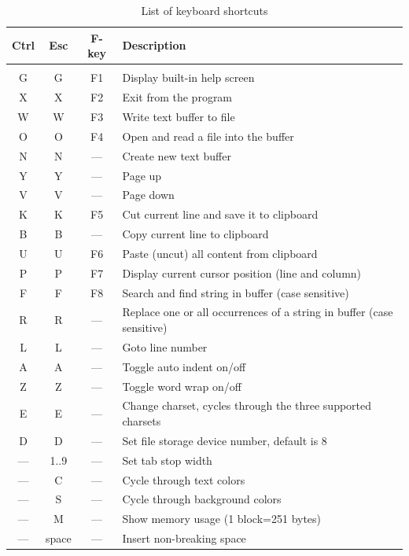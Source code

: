 \documentclass{article}
\begin{document}
	\begin{longtable}{c c c l}
		\caption{List of keyboard shortcuts} \\
	    \textbf{Ctrl} & \textbf{Esc} & \textbf{F-key} & \textbf{Description} \\
	    \hline \\
            G    & G   & F1    & Display built-in help screen \\
            X    & X   & F2    & Exit from the program \\
            W    & W   & F3    & Write text buffer to file \\
            O    & O   & F4    & Open and read a file into the buffer \\
            N    & N   & ---   & Create new text buffer \\
            Y    & Y   & ---   & Page up \\
            V    & V   & ---   & Page down \\
            K    & K   & F5    & Cut current line and save it to clipboard \\
            B    & B   & ---   & Copy current line to clipboard \\
            U    & U   & F6    & Paste (uncut) all content from clipboard \\
            P    & P   & F7    & Display current cursor position (line and column) \\
            F    & F   & F8    & Search and find string in buffer (case sensitive) \\
            R    & R   & ---   & Replace one or all occurrences of a string in buffer (case sensitive) \\
            L    & L   & ---   & Goto line number \\
            A    & A   & ---   & Toggle auto indent on/off \\
            Z    & Z   & ---   & Toggle word wrap on/off \\
            E    & E   & ---   & Change charset, cycles through the three supported charsets\\
            D    & D   & ---   & Set file storage device number, default is 8 \\
            ---    & 1..9 & ---    & Set tab stop width \\
            ---    & C   &  ---    & Cycle through text colors \\
            ---    & S   &  ---    & Cycle through background colors \\
            ---    & M   &  ---    & Show memory usage (1 block=251 bytes) \\
            ---    & space & ---   & Insert non-breaking space 
        \end{longtable}
\end{document}
